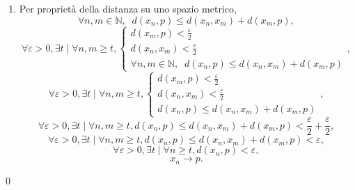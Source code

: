 \begin{demonstration}
\begin{enumerate}[label=(\roman*)]
\[\begin{cases}
                d\left(x_n,x_m\right)<\frac{\varepsilon}{2}\\
            \end{cases}.
        \]
        \item Per proprietà della distanza su uno spazio metrico,
        \[
            \forall n,m\in\mathbb{N},\;\;d\left(x_n,p\right)\leq d\left(x_n,x_m\right)+d\left(x_m, p\right),\]\[
            \forall\varepsilon>0,\exists t\mid\forall n,m\geq t,\begin{cases}
                d\left(x_m,p\right)<\frac{\varepsilon}{2}\\
                d\left(x_n,x_m\right)<\frac{\varepsilon}{2}\\
                \forall n,m\in\mathbb{N},\;\;d\left(x_n,p\right)\leq d\left(x_n,x_m\right)+d\left(x_m, p\right)
            \end{cases}, \]\[
            \forall\varepsilon>0,\exists t\mid\forall n,m\geq t,\begin{cases}
                d\left(x_m,p\right)<\frac{\varepsilon}{2}\\
                d\left(x_n,x_m\right)<\frac{\varepsilon}{2}\\
                d\left(x_n,p\right)\leq d\left(x_n,x_m\right)+d\left(x_m, p\right)
            \end{cases}, \]\[
            \forall\varepsilon>0,\exists t\mid\forall n,m\geq t,
            d\left(x_n,p\right)\leq d\left(x_n,x_m\right)+d\left(x_m, p\right)<
            \frac{\varepsilon}{2}+\frac{\varepsilon}{2}, \]\[
            \forall\varepsilon>0,\exists t\mid\forall n,m\geq t,
            d\left(x_n,p\right)\leq d\left(x_n,x_m\right)+d\left(x_m, p\right)<\varepsilon, \]\[
            \forall\varepsilon>0,\exists t\mid\forall n\geq t,
            d\left(x_n,p\right)<\varepsilon,\]\[
            x_n\rightarrow p.
        \]
    \end{enumerate}
    \qed
\end{demonstration}
